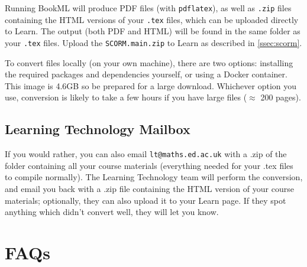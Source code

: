Running BookML will produce PDF files (with \verb|pdflatex|), as well as \verb|.zip| files containing the HTML versions of your \verb|.tex| files, which can be uploaded directly to Learn. The output (both PDF and HTML) will be found in the same folder as your \verb|.tex| files.
Upload the \verb|SCORM.main.zip| to Learn as described in \ref{ssec:scorm}.


To convert files locally (on your own machine), there are two options: installing the required packages and dependencies yourself, or using a Docker container. 
This image is 4.6GB so be prepared for a large download.
Whichever option you use, conversion is likely to take a few hours if you have large files (\(\approx\) 200 pages). 





\subsection{Learning Technology Mailbox}
\label{ssec:lt}

If you would rather, you can also email \verb|lt@maths.ed.ac.uk| with a .zip of the folder containing all your course materials (everything needed for your .tex files to compile normally). The Learning Technology team will perform the conversion, and email you back with a .zip file containing the HTML version of your course materials; optionally, they can also upload it to your Learn page. If they spot anything which didn't convert well, they will let you know.


\section{FAQs}
\label{sec:FAQ}


